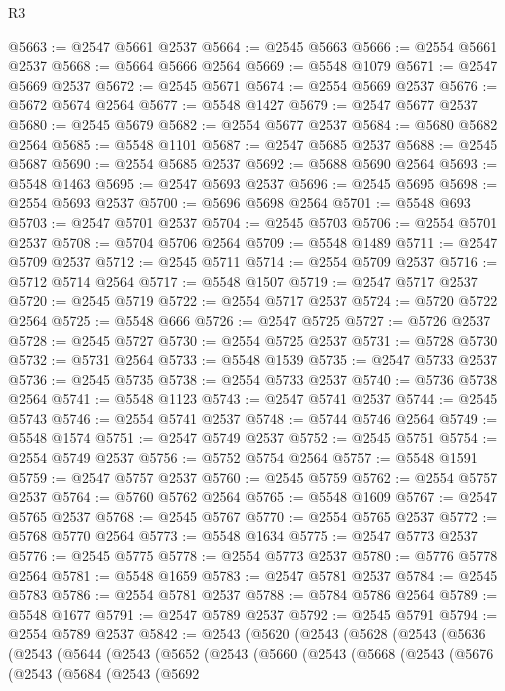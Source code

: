 \begin{lexlean}{R3}
\begin{coremodule}
@5663 := @2547 @5661 @2537
@5664 := @2545 @5663
@5666 := @2554 @5661 @2537
@5668 := @5664 @5666 @2564
@5669 := @5548 @1079
@5671 := @2547 @5669 @2537
@5672 := @2545 @5671
@5674 := @2554 @5669 @2537
@5676 := @5672 @5674 @2564
@5677 := @5548 @1427
@5679 := @2547 @5677 @2537
@5680 := @2545 @5679
@5682 := @2554 @5677 @2537
@5684 := @5680 @5682 @2564
@5685 := @5548 @1101
@5687 := @2547 @5685 @2537
@5688 := @2545 @5687
@5690 := @2554 @5685 @2537
@5692 := @5688 @5690 @2564
@5693 := @5548 @1463
@5695 := @2547 @5693 @2537
@5696 := @2545 @5695
@5698 := @2554 @5693 @2537
@5700 := @5696 @5698 @2564
@5701 := @5548 @693
@5703 := @2547 @5701 @2537
@5704 := @2545 @5703
@5706 := @2554 @5701 @2537
@5708 := @5704 @5706 @2564
@5709 := @5548 @1489
@5711 := @2547 @5709 @2537
@5712 := @2545 @5711
@5714 := @2554 @5709 @2537
@5716 := @5712 @5714 @2564
@5717 := @5548 @1507
@5719 := @2547 @5717 @2537
@5720 := @2545 @5719
@5722 := @2554 @5717 @2537
@5724 := @5720 @5722 @2564
@5725 := @5548 @666
@5726 := @2547 @5725
@5727 := @5726 @2537
@5728 := @2545 @5727
@5730 := @2554 @5725 @2537
@5731 := @5728 @5730
@5732 := @5731 @2564
@5733 := @5548 @1539
@5735 := @2547 @5733 @2537
@5736 := @2545 @5735
@5738 := @2554 @5733 @2537
@5740 := @5736 @5738 @2564
@5741 := @5548 @1123
@5743 := @2547 @5741 @2537
@5744 := @2545 @5743
@5746 := @2554 @5741 @2537
@5748 := @5744 @5746 @2564
@5749 := @5548 @1574
@5751 := @2547 @5749 @2537
@5752 := @2545 @5751
@5754 := @2554 @5749 @2537
@5756 := @5752 @5754 @2564
@5757 := @5548 @1591
@5759 := @2547 @5757 @2537
@5760 := @2545 @5759
@5762 := @2554 @5757 @2537
@5764 := @5760 @5762 @2564
@5765 := @5548 @1609
@5767 := @2547 @5765 @2537
@5768 := @2545 @5767
@5770 := @2554 @5765 @2537
@5772 := @5768 @5770 @2564
@5773 := @5548 @1634
@5775 := @2547 @5773 @2537
@5776 := @2545 @5775
@5778 := @2554 @5773 @2537
@5780 := @5776 @5778 @2564
@5781 := @5548 @1659
@5783 := @2547 @5781 @2537
@5784 := @2545 @5783
@5786 := @2554 @5781 @2537
@5788 := @5784 @5786 @2564
@5789 := @5548 @1677
@5791 := @2547 @5789 @2537
@5792 := @2545 @5791
@5794 := @2554 @5789 @2537
@5842 := @2543
    (@5620
      (@2543
        (@5628
          (@2543
            (@5636
              (@2543
                (@5644
                  (@2543
                    (@5652
                      (@2543
                        (@5660
                          (@2543
                            (@5668
                              (@2543
                                (@5676
                                  (@2543
                                    (@5684
                                      (@2543
                                        (@5692

\end{coremodule}
\end{lexlean}
